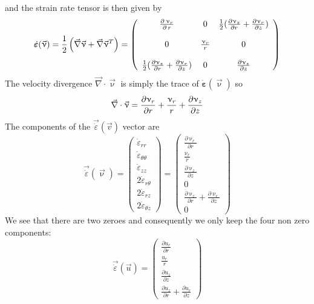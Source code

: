 and the strain rate tensor is then given by 
\begin{equation}
\dot{\bm \varepsilon}(\vec{\upnu})
=\frac12\left(\vec\nabla \vec{\upnu}+\vec\nabla \vec{\upnu}^T\right)
=
\left(
\begin{array}{ccc}
{\partial \, \upnu_r \over \partial \, r} &
0 &
\frac12({\partial \upnu_{z} \over \partial r} + {\partial \upnu_r \over \partial z}) \\ \\
0 & {\upnu_r \over r} & 0 \\ \\
\frac12({\partial \upnu_{z} \over \partial r} + {\partial \upnu_r \over \partial z} ) & 0 & {\partial \upnu_{z} \over \partial z} 
\end{array}
\right)
\end{equation}
The velocity divergence $\vec\nabla \cdot \vec{\upnu}$ is simply the trace of $\dot{\bm \varepsilon}(\vec{\upnu})$ so 
\[
\vec\nabla \cdot \vec{\upnu}
= {\partial \upnu_r \over \partial r} +{\upnu_r \over r}
+{\partial \upnu_{z} \over \partial z}
\]
The components of the $\vec{\dot{\varepsilon}}(\vec{v})$ vector are
\[
\vec{\dot{\varepsilon}}(\vec \upnu)
=
\left(
\begin{array}{c}
\dot\varepsilon_{rr} \\
\dot\varepsilon_{\theta\theta} \\
\dot\varepsilon_{zz} \\
2\dot\varepsilon_{r\theta} \\
2\dot\varepsilon_{rz} \\
2\dot\varepsilon_{\theta z} 
\end{array}
\right)
=
\left(
\begin{array}{c}
\frac{\partial \upnu_r}{\partial r} \\ 
\frac{\upnu_r}{r} \\ 
\frac{\partial \upnu_z}{\partial z} \\ 
0 \\ 
\frac{\partial \upnu_z}{\partial r}+\frac{\partial \upnu_r}{\partial z} \\ 
0
\end{array}
\right)
\]
We see that there are two zeroes and consequently
we only keep the four non zero components:
\[
\vec{\dot{\varepsilon}}(\vec u)
=
\left(
\begin{array}{c}
\frac{\partial u_r}{\partial r} \\ 
\frac{u_r}{r} \\ 
\frac{\partial u_z}{\partial z} \\ 
\frac{\partial u_z}{\partial r}+\frac{\partial u_r}{\partial z} 
\end{array}
\right)
\]
